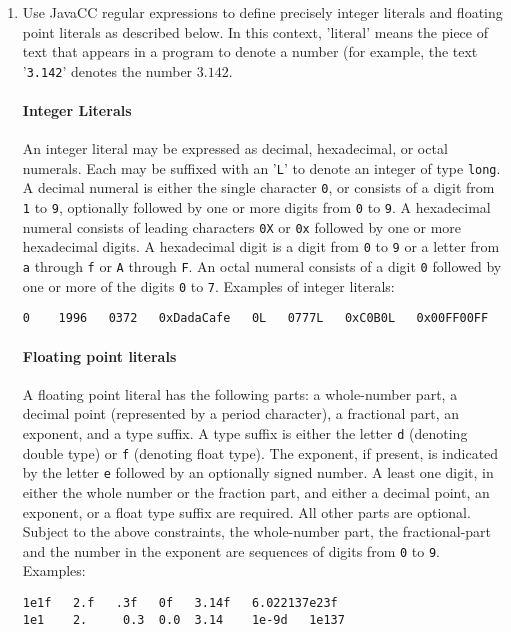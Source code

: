 \documentclass[11pt]{article}
\begin{document}
\begin{enumerate}
\item

Use JavaCC regular expressions to define precisely integer literals and
floating point literals as described below. In this context, 'literal' means 
the piece of text that appears in a program to denote a number (for example,
the text '\verb+3.142+' denotes the number $3.142$.
\paragraph{Integer Literals} 
An integer literal may be expressed as decimal, hexadecimal, or octal numerals.
Each may be suffixed with an '\verb+L+' to denote an integer 
of type \verb+long+.
A decimal numeral is either the single character \verb+0+, or consists
of a digit from \verb+1+ to \verb+9+, optionally followed by one or
more digits from \verb+0+ to \verb+9+. A hexadecimal numeral
consists of leading characters \verb+0X+ or \verb+0x+ followed by
one or more hexadecimal digits. A hexadecimal digit is a 
digit from \verb+0+ to \verb+9+ or a letter from \verb+a+ through \verb+f+
or \verb+A+ through \verb+F+. An octal numeral consists of a
digit \verb+0+ followed by one or more of the digits \verb+0+ to 
\verb+7+. Examples of integer literals: 
\begin{verbatim}
0    1996   0372   0xDadaCafe   0L   0777L   0xC0B0L   0x00FF00FF
\end{verbatim}
\paragraph{Floating point literals}
A floating point literal has the following parts:
a whole-number part, a decimal point (represented by a period character),
a fractional part, an exponent, and a type suffix. 
A type suffix is
either the letter \verb+d+ (denoting double type) or \verb+f+ (denoting
float type).
The exponent, if present, is indicated by the letter \verb+e+ followed 
by an optionally signed number.  A least one digit, in either the
whole number or the fraction part, and either a decimal point, 
an exponent, or a float type suffix are required. All other
parts are optional.
Subject to the above constraints, 
the whole-number part, the fractional-part and the number in
the exponent are sequences of
digits from \verb+0+ to \verb+9+.
Examples: 
\begin{verbatim}
1e1f   2.f   .3f   0f   3.14f   6.022137e23f   
1e1    2.     0.3  0.0  3.14    1e-9d   1e137
\end{verbatim}


\end{enumerate}
\end{document}
